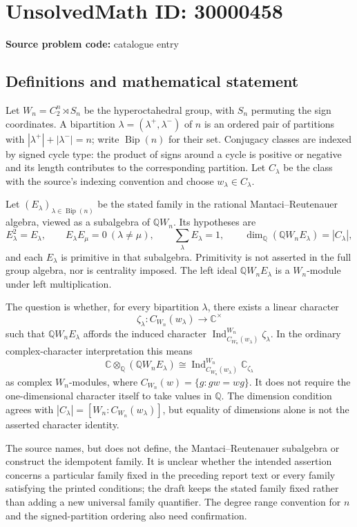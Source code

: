 \documentclass[11pt]{article}
\newcommand{\Q}{\mathbb{Q}}
\newcommand{\C}{\mathbb{C}}
\begin{document}
\section*{UnsolvedMath ID: 30000458}
\textbf{Source problem code:} catalogue entry
\subsection{Definitions and mathematical statement}
Let \(W_n=C_2^n\rtimes S_n\) be the hyperoctahedral group, with \(S_n\) permuting the sign coordinates. A bipartition \(\lambda=(\lambda^+,\lambda^-)\) of \(n\) is an ordered pair of partitions with \(|\lambda^+|+|\lambda^-|=n\); write \(\operatorname{Bip}(n)\) for their set. Conjugacy classes are indexed by signed cycle type: the product of signs around a cycle is positive or negative and its length contributes to the corresponding partition. Let \(C_\lambda\) be the class with the source's indexing convention and choose \(w_\lambda\in C_\lambda\).

Let \((E_\lambda)_{\lambda\in\operatorname{Bip}(n)}\) be the stated family in the rational Mantaci--Reutenauer algebra, viewed as a subalgebra of \(\Q W_n\). Its hypotheses are
\[
 E_\lambda^2=E_\lambda,\qquad
 E_\lambda E_\mu=0\ (\lambda\ne\mu),\qquad
 \sum_\lambda E_\lambda=1,\qquad
 \dim_\Q(\Q W_nE_\lambda)=|C_\lambda|,
\]
and each \(E_\lambda\) is primitive in that subalgebra. Primitivity is not asserted in the full group algebra, nor is centrality imposed. The left ideal \(\Q W_nE_\lambda\) is a \(W_n\)-module under left multiplication.

The question is whether, for every bipartition \(\lambda\), there exists a linear character
\[
 \zeta_\lambda:C_{W_n}(w_\lambda)\longrightarrow\C^\times
\]
such that \(\Q W_nE_\lambda\) affords the induced character \(\operatorname{Ind}_{C_{W_n}(w_\lambda)}^{W_n}\zeta_\lambda\). In the ordinary complex-character interpretation this means
\[
 \C\otimes_\Q(\Q W_nE_\lambda)
 \cong\operatorname{Ind}_{C_{W_n}(w_\lambda)}^{W_n}\C_{\zeta_\lambda}
\]
as complex \(W_n\)-modules, where \(C_{W_n}(w)=\{g:gw=wg\}\). It does not require the one-dimensional character itself to take values in \(\Q\). The dimension condition agrees with \(|C_\lambda|=[W_n:C_{W_n}(w_\lambda)]\), but equality of dimensions alone is not the asserted character identity.

The source names, but does not define, the Mantaci--Reutenauer subalgebra or construct the idempotent family. It is unclear whether the intended assertion concerns a particular family fixed in the preceding report text or every family satisfying the printed conditions; the draft keeps the stated family fixed rather than adding a new universal family quantifier. The degree range convention for \(n\) and the signed-partition ordering also need confirmation.
\end{document}
